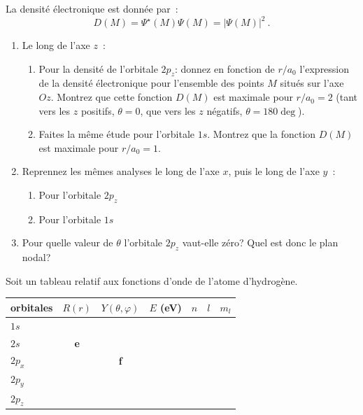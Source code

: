 La densit\'e \'electronique est donn\'ee par~:
$$
D(M)=\Psi^\star(M)\Psi(M)=|\Psi(M)|^2  \ .
$$
\begin{enumerate}
\item Le long de l'axe $z$~:
\begin{enumerate}
\item Pour la densit\'e de l'orbitale $2p_z$: donnez en fonction de $r/a_0$ l'expression de la densit\'e \'electronique pour l'ensemble des points $M$ situ\'es sur l'axe $Oz$. 
Montrez que cette fonction $D(M)$ est maximale pour $r/a_0=2$ (tant vers les $z$ positifs, $\theta=0$, que vers les $z$ n\'egatifs, $\theta=180\deg$).
\item Faites la m\^eme  \' etude  pour l'orbitale $1s$. Montrez que la fonction $D(M)$ est maximale pour $r/a_0=1$.
\end{enumerate}
\item Reprennez les m\^emes analyses le long de l'axe $x$, puis le long de l'axe $y$~:
         \begin{enumerate} \item Pour l'orbitale $2p_z$ \item Pour l'orbitale $1s$ \end{enumerate}
\item Pour quelle valeur de $\theta$ l'orbitale $2p_z$ vaut-elle z\'ero? Quel est donc le plan nodal?
\end{enumerate}

%

Soit un tableau relatif aux fonctions d'onde de l'atome d'hydrog\`ene.

\begin{center}
\begin{tabular}{|l|c|c|c|c|c| c|}\hline
orbitales & $R(r)$ & $Y(\theta,\varphi)$ & $E$ (eV) & $n$ & $l$ &  $m_l$\\\hline
$1s$   &           &                     & & & &\\\hline
$2s$   & \textbf{e}&                     & & & &\\\hline
$2p_x$ &           & \textbf{f}          & & & &\cellcolor{gray} \\\hline
$2p_y$ &           &                     & & & &\cellcolor{gray}\\\hline
$2p_z$ &           &                     & & & &\\\hline
\end{tabular}
\end{center}


